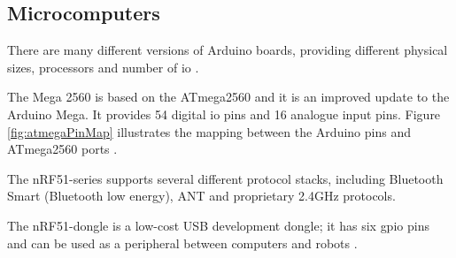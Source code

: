 \subsection{Microcomputers}
There are many different versions of Arduino boards, providing different physical sizes, processors and number of \acrfull{io} \cite{arduinoboards}. 

The Mega 2560 is based on the ATmega2560 and it is an improved update to the Arduino Mega. It provides 54 digital \acrshort{io} pins and 16 analogue input pins. Figure \ref{fig:atmegaPinMap} illustrates the mapping between the Arduino pins and ATmega2560 ports \cite{arduinomega2560}. 

\newpage
{}
The nRF51-series supports several different protocol stacks, including Bluetooth Smart (Bluetooth low energy), ANT and proprietary 2.4GHz protocols. 

The nRF51-dongle is a low-cost USB development dongle; it has six \acrfull{gpio} pins and can be used as a peripheral between computers and robots \cite{nrf51Dongle}.


